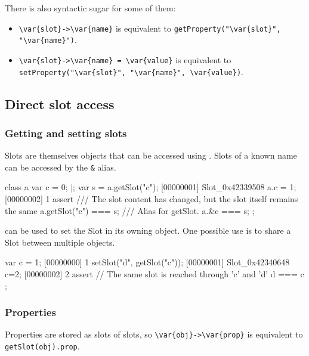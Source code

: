 There is also syntactic sugar for some of them:

\begin{itemize}
\item \lstinline|\var{slot}->\var{name}| is equivalent to
  \lstinline[style=varInString]|getProperty("\var{slot}", "\var{name}")|.
\item \lstinline|\var{slot}->\var{name} = \var{value}| is equivalent to
  \lstinline[style=varInString]|setProperty("\var{slot}", "\var{name}", \var{value})|.
\end{itemize}


\subsection{Direct slot access}

\subsubsection{Getting and setting slots}

Slots are themselves objects that can be accessed using
. Slots of a known name can be accessed by the
\lstinline|&| alias.

\begin{urbiscript}
class a {
  var c = 0;
}|;
var s = a.getSlot("c");
[00000001] Slot_0x42339508
a.c = 1;
[00000002] 1
assert
{
  /// The slot content has changed, but the slot itself remains the same
  a.getSlot("c") === s;
  /// Alias for getSlot.
  a.&c === s;
};
\end{urbiscript}

 can be used to set the Slot in its owning object.
One possible use is to share a Slot between multiple objects.

\begin{urbiscript}
var c = 1;
[00000000] 1
setSlot("d", getSlot("c"));
[00000001] Slot_0x42340648
c=2;
[00000002] 2
assert
{
  // The same slot is reached through 'c' and 'd'
  d === c
};

\end{urbiscript}

\subsubsection{Properties}

Properties are stored as slots of slots, so \lstinline|\var{obj}->\var{prop}|
is equivalent to \lstinline|getSlot(obj).prop|.

